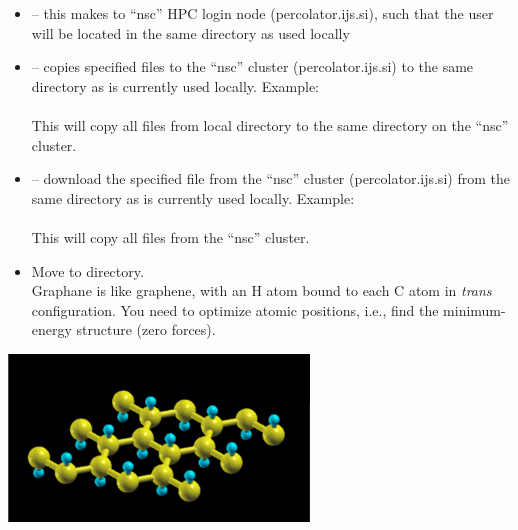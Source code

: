 \documentclass[landscape]{foils}
\begin{document}
{\begin{itemize}
\clearpage
\item {} -- this makes  to ``nsc'' HPC login node
  (percolator.ijs.si), such that the user will be located in the same
  directory as used locally
\vspace{0.5em}
\item {} -- copies specified files to the ``nsc''
  cluster (percolator.ijs.si) to the same directory as is currently
  used locally. Example:\\[0.5em]
  \\[0.5em]
  This will copy all  files from local directory to the
  same directory on the ``nsc'' cluster.
\vspace{0.5em}  
\item {} -- download the specified file from the
  ``nsc'' cluster (percolator.ijs.si) from the same directory as is
  currently used locally. Example:\\[0.5em]
  \\[0.5em]
  This will copy all  files from the ``nsc'' cluster.
\end{itemize}
}
\rightheader{}

\parbox{17cm}{
  \begin{itemize}
  \item Move to  directory.\\[0.5em]
    Graphane is like graphene, with an H atom bound to each C atom in
    {\em trans} configuration. You need to optimize atomic positions,
    i.e., find the minimum-energy structure (zero forces).
  \end{itemize}
} \hskip 1cm
\parbox{8cm}{ \includegraphics[width=8cm]{figs/graphane.pdf}}
\end{document}
